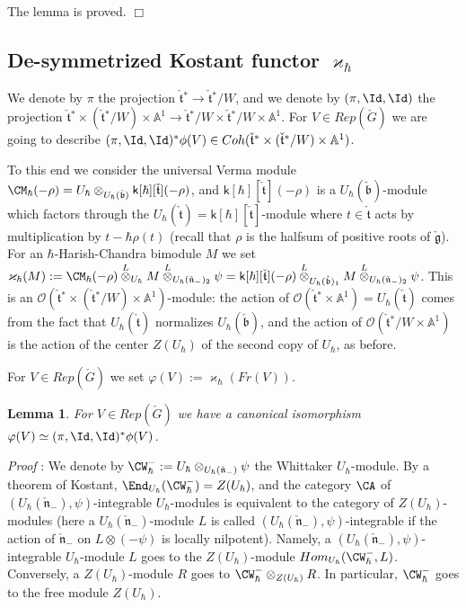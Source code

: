 \documentclass[11pt]{amsart}
\newtheorem{lem}{Lemma}
\theoremstyle{definition}
\theoremstyle{remark}
\renewcommand{\O}{{\mathcal O}}
\theoremstyle{remark}
\newcommand{\cal}{\mathcal}
\newcommand{\<}{\langle}
\renewcommand{\>}{\rangle}
\newcommand{\Lg}{\check{\mathfrak g}{}}
\newcommand{\Ln}{\check{\mathfrak n}{}}
\newcommand{\Lt}{\check{\mathfrak t}{}}
\newcommand{\Lb}{\check{\mathfrak b}{}}
\newcommand{\LG}{{\check{G}}}
\renewcommand{\O}{{\cal O}}
\newcommand{\Aone}{{\mathbb A}^1}
\newcommand{\kk}{\mathsf k}
\renewcommand{\proof}{{\it Proof }}
\begin{document}
The lemma is proved.
\hfill $\Box$



\subsection{De-symmetrized Kostant functor $\varkappa_\hbar$} 
We denote by $\pi$ the projection $\Lt^*\to\Lt^*/W$, and
we denote by $(\pi,\Id,\Id)$ the projection $\Lt^*\times(\Lt^*/W)\times\Aone
\to\Lt^*/W\times\Lt^*/W\times\Aone$. For $V\in Rep(\LG)$ we are going
to describe $(\pi,\Id,\Id)^*\phi(V)\in Coh(\Lt^*\times(\Lt^*/W)\times\Aone)$.

To this end we consider the universal Verma module 
$\CM_\hbar(-\rho)=
U_\hbar\otimes_{U_\hbar(\Lb)}\kk[\hbar][\Lt](-\rho)$,
and $\kk[\hbar][\Lt](-\rho)$ is a $U_\hbar(\Lb)$-module which factors
through the $U_\hbar(\Lt)=\kk[\hbar][\Lt]$-module where $t\in\Lt$ acts by
multiplication by $t-\hbar\rho(t)$ (recall that $\rho$ is the halfsum
of positive roots of $\Lg$). For an
$\hbar$-Harish-Chandra bimodule $M$ we set
$\varkappa_\hbar(M):=\CM_\hbar(-\rho)\overset{L}{\otimes}_{U_\hbar}M
\overset{L}{\otimes}_{U_\hbar(\Ln_-)_2}\psi=
\kk[\hbar][\Lt](-\rho)\overset{L}{\otimes}_{U_\hbar(\Lb)_1}M
\overset{L}{\otimes}_{U_\hbar(\Ln_-)_2}\psi$. This is an
$\O(\Lt^*\times(\Lt^*/W)\times\Aone)$-module: the action of 
$\O(\Lt^*\times\Aone)=U_\hbar(\Lt)$ comes from the fact that $U_\hbar(\Lt)$
normalizes $U_\hbar(\Lb)$, and the action of $\O(\Lt^*/W\times\Aone)$ is the
action of the center $Z(U_\hbar)$ of the second copy of $U_\hbar$, as before.

For $V\in Rep(\LG)$ we set $\varphi(V):=\varkappa_\hbar(Fr(V))$.

\begin{lem}
\label{mit}
For $V\in Rep(\LG)$ we have a canonical isomorphism
$\varphi(V)\simeq(\pi,\Id,\Id)^*\phi(V)$.
\end{lem}

\proof: We denote by $\CW_\hbar^-:=U_\hbar\otimes_{U_\hbar(\Ln_-)}\psi$ 
the Whittaker
$U_\hbar$-module. By a theorem of Kostant, 
$\End_{U_\hbar}(\CW_\hbar^-)=Z(U_\hbar)$, and the category $\CA$ of 
$(U_\hbar(\Ln_-),\psi)$-integrable $U_\hbar$-modules is equivalent to the
category of $Z(U_\hbar)$-modules (here a $U_\hbar(\Ln_-)$-module $L$
is called $(U_\hbar(\Ln_-),\psi)$-integrable if the action of $\Ln_-$
on $L\otimes(-\psi)$ is locally nilpotent). Namely, a 
$(U_\hbar(\Ln_-),\psi)$-integrable $U_\hbar$-module $L$ goes to the 
$Z(U_\hbar)$-module $Hom_{U_\hbar}(\CW_\hbar^-,L)$. Conversely, 
a $Z(U_\hbar)$-module $R$ goes to $\CW_\hbar^-\otimes_{Z(U_\hbar)}R$.
In particular, $\CW_\hbar^-$ goes to the free module $Z(U_\hbar)$.
\end{document}
